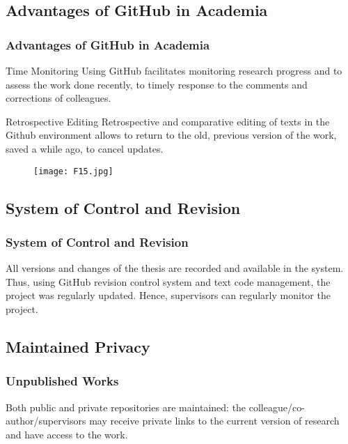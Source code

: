\documentclass[pdflatex,compress,8pt,
	xcolor={dvipsnames,dvipsnames,svgnames,x11names,table},
	hyperref={
	breaklinks = true, 
	pdfauthor={Lemenkova Polina}, 
	pdfsubject={Preentation}, 
	pdfcreator={Lemenkova Polina}, 
	pdfproducer={Lemenkova Polina}, 
	colorlinks=true,linkcolor=blue, 
	citecolor=NavyBlue, 
	urlcolor = NavyBlue, 
	breaklinks = true}]{beamer}
\begin{document}
\subsection{Advantages of GitHub in Academia}
\begin{frame}\frametitle{Advantages of GitHub in Academia}
\vspace{1em} 
\begin{alertblock}{Time Monitoring}
Using GitHub facilitates monitoring research progress and to assess the work done recently, to timely response to the comments and corrections of colleagues.
\end{alertblock}

\begin{block}{Retrospective Editing}
Retrospective and comparative editing of texts in the Github environment allows to return to the old, previous version of the work, saved a while ago, to cancel updates.
\end{block}

\begin{figure}[H]
	\centering
		\texttt{[image: F15.jpg]}
\end{figure}

\end{frame}

\subsection{System of Control and Revision}
\begin{frame}\frametitle{System of Control and Revision}
\vspace{1em}
All versions and changes of the thesis are recorded and available in the system. Thus, using GitHub revision control system and text code management, the project was regularly updated. Hence, supervisors can regularly monitor the project.
\begin{figure}[H]
	\centering
			\hspace{1mm}
			\hspace{1mm}
\end{figure}
\end{frame}

\subsection{Maintained Privacy}
\begin{frame}\frametitle{Unpublished Works}
Both public and private repositories are maintained: the colleague/co-author/supervisors may receive private links to the current version of research and have access to the work. 
\begin{figure}[H]
	\centering
			\hspace{1mm}
			\hspace{1mm}
\end{figure}
\end{frame}
\end{document}
